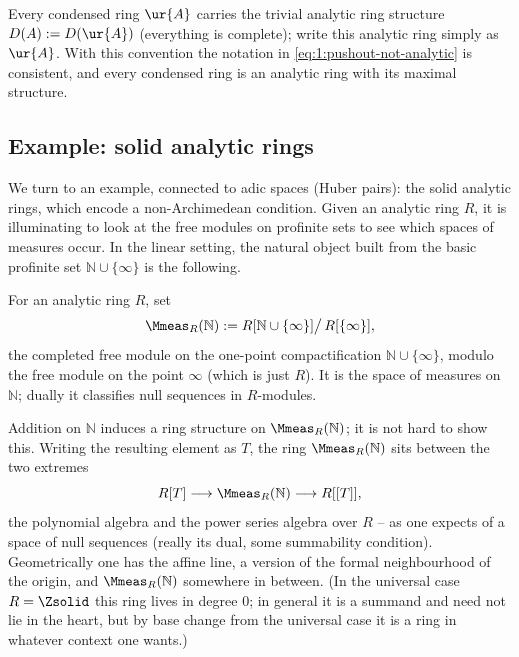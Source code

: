 \begin{remark}
\label{rmk:1:trivial-structure}
Every condensed ring $\ur{A}$ carries the trivial analytic ring structure
$D(A):=D(\ur{A})$ (everything is complete); write this analytic ring simply as
$\ur{A}$. With this convention the notation in \eqref{eq:1:pushout-not-analytic}
is consistent, and every condensed ring is an analytic ring with its maximal
structure.
\end{remark}

\subsection{Example: solid analytic rings}

We turn to an example, connected to adic spaces (Huber pairs): the solid analytic
rings, which encode a non-Archimedean condition. Given an analytic ring $R$, it
is illuminating to look at the free modules on profinite sets to see which spaces
of measures occur. In the linear setting, the natural object built from the basic
profinite set $\mathbb{N}\cup\{\infty\}$ is the following.

\begin{definition}
\label{def:1:measures-on-N}
For an analytic ring $R$, set
\begin{equation*}
\Mmeas_R(\mathbb{N}):=R[\mathbb{N}\cup\{\infty\}]\big/\,R[\{\infty\}],
\end{equation*}
the completed free module on the one-point compactification
$\mathbb{N}\cup\{\infty\}$, modulo the free module on the point $\infty$ (which is
just $R$). It is the space of measures on $\mathbb{N}$; dually it classifies null
sequences in $R$-modules.
\end{definition}

\begin{remark}
\label{rmk:1:MRN-ring}
Addition on $\mathbb{N}$ induces a ring structure on $\Mmeas_R(\mathbb{N})$; it is
not hard to show this. Writing the resulting element as $T$, the ring
$\Mmeas_R(\mathbb{N})$ sits between the two extremes
\begin{equation}
\label{eq:1:MRN-between}
R[T]\longrightarrow \Mmeas_R(\mathbb{N})\longrightarrow R[[T]],
\end{equation}
the polynomial algebra and the power series algebra over $R$ -- as one expects
of a space of null sequences (really its dual, some summability condition).
Geometrically one has the affine line, a version of the formal neighbourhood of
the origin, and $\Mmeas_R(\mathbb{N})$ somewhere in between. (In the universal
case $R=\Zsolid$ this ring lives in degree $0$; in general it is a summand and
need not lie in the heart, but by base change from the universal case it is a
ring in whatever context one wants.)
\end{remark}

